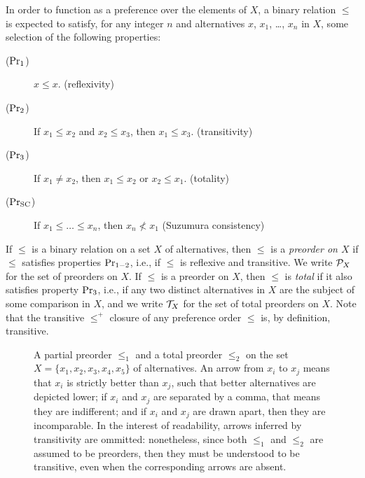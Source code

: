 In order to function as a preference over the elements of $X$,
a binary relation $\le$ is expected to satisfy,
for any integer $n$ 
and alternatives $x$, $x_1$, \dots, $x_{n}$ in $X$,
some selection of the following properties:
\begin{description}
	\item[($\mathrm{Pr}_{1}$)] $x \le x$. \hfill(reflexivity)
	\item[($\mathrm{Pr}_{2}$)] If $x_1\le x_2$ and $x_2\le x_3$, then $x_1\le x_3$. \hfill(transitivity)
	\item[($\mathrm{Pr}_{3}$)] If $x_1\neq x_2$, 
		then $x_1 \le x_{2}$ or $x_{2} \le x_{1}$. \hfill(totality)
	\item[($\mathrm{Pr}_{{\mathrm{SC}}}$)] If $x_1\le\dots\le x_n$, then $x_n\not< x_1$ \hfill(Suzumura consistency)
\end{description}

If $\le$ is a binary relation on a set $X$ of alternatives, 
then $\le$ is a \emph{preorder on $X$} if $\le$ satisfies properties $\mathrm{Pr}_{1-2}$,
i.e., if $\le$ is reflexive and transitive.
We write $\mathcal{P}_X$ for the set of preorders on $X$.
If $\le$ is a preorder on $X$, 
then $\le$ is \emph{total} if it also satisfies property $\mathrm{Pr}_{3}$,
i.e., if any two distinct alternatives in $X$ are the subject of some comparison
in $X$,
and we write $\mathcal{T}_{X}$ for the set of total preorders on $X$.
Note that the transitive $\le^+$ closure of any preference order $\le$
is, by definition, transitive.


\begin{figure}\centering
	\caption{
		A partial preorder $\le_1$ and a total preorder $\le_2$ on the 
		set $X=\{x_1,x_2,x_3,x_4,x_5\}$ of alternatives.
		An arrow from $x_i$ to $x_j$ means that $x_i$ is strictly better than 
		$x_j$, such that better alternatives are depicted lower; if $x_i$ and $x_j$
		are separated by a comma, that means they are indifferent;
		and if $x_i$ and $x_j$ are drawn apart, then they are incomparable.
		In the interest of readability, arrows inferred by transitivity
		are ommitted: nonetheless, since both $\le_1$ and $\le_2$ are assumed to be preorders,
		then they must be understood to be transitive, even when the corresponding
		arrows are absent.
	}
	\label{fig:2-preorders}
\end{figure}

